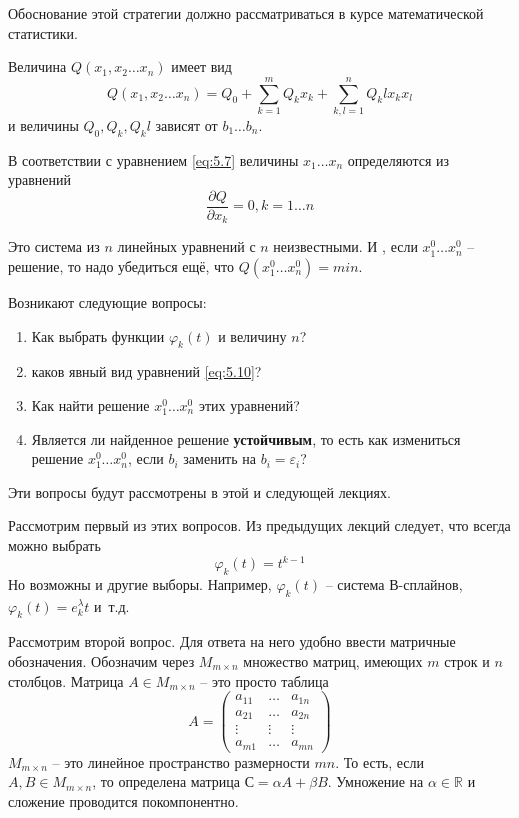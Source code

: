 Обоснование этой стратегии должно рассматриваться в курсе математической статистики.

Величина $Q(x_1, x_2 \dots x_n)$ имеет вид
\begin{equation}
	Q(x_1, x_2 \dots x_n) = Q_0 + \sum_{k=1}^m{Q_k x_k } + \sum_{k, l=1}^n {Q_kl x_k x_l}
\end{equation}
и величины $Q_0, Q_k, Q_kl$ зависят от $b_1 \dots b_n$.


В соответствии с уравнением \ref{eq:5.7} величины  $x_1 \dots x_n$ определяются из уравнений
\begin{equation} \label{eq:5.10}
	 \frac{\partial Q}{\partial x_k } = 0, k = 1 \dots n
\end{equation}

Это система из $n$ линейных уравнений с $n$ неизвестными. И , если $x_1^0 \dots x_n^0$ -- решение, то надо убедиться ещё, что $Q(x_1^0 \dots x_n^0) = min$.

Возникают следующие вопросы: 
\begin{enumerate}[nolistsep]
	\item Как выбрать функции $\varphi_k (t) $  и величину $n$?
	\item каков явный вид уравнений \ref{eq:5.10}?
	\item Как найти решение $x_1^0 \dots x_n^0$ этих уравнений?
	\item Является ли найденное решение \textbf{устойчивым}, то есть как измениться решение $x_1^0 \dots x_n^0$, если $b_i$ заменить на  $b_i = \varepsilon_i $?
\end{enumerate}

Эти вопросы будут рассмотрены в этой и следующей лекциях.

Рассмотрим первый из этих вопросов.
Из предыдущих лекций следует, что всегда можно выбрать 
\begin{equation}
	\varphi_k(t) = t^{k-1}
\end{equation}
Но возможны и другие выборы. Например, $\varphi_k(t)$ -- система В-сплайнов, $\varphi_k(t) = e^\lambda_k t$ и~т.д.

Рассмотрим второй вопрос. Для ответа на него удобно ввести матричные обозначения. Обозначим через $M_{m \times n}$ множество матриц, имеющих $m$ строк и $n$ столбцов. Матрица $A \in M_{m \times n}$ -- это просто таблица
\begin{equation}\label{eq:5.12}
	A =
	\begin{pmatrix}
	a_{11} & \dots & a_{1n}\\
	a_{21} & \dots & a_{2n}\\
	\vdots & \vdots & \vdots \\
	a_{m1} & \dots & a_{mn}
	\end{pmatrix}
\end{equation}
$M_{m \times n}$ -- это линейное пространство размерности $mn$. То есть, если $A,B \in M_{m \times n}$, то определена матрица $С = \alpha A + \beta B$. Умножение на $\alpha \in \mathbb{R}$ и сложение проводится покомпонентно.


